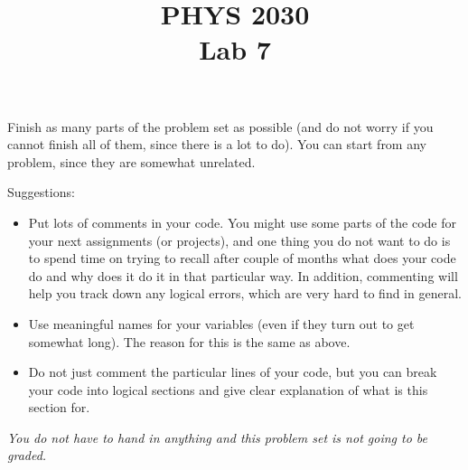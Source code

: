 \documentclass[letterpaper]{article}
\title{PHYS 2030 \\Lab 7}
\begin{document}
\maketitle
Finish as many parts of the problem set as possible (and do not worry if you cannot finish all of them, since there is a lot to do). You can start from any problem, since they are somewhat unrelated.

Suggestions: 
\begin{itemize}
\item Put lots of comments in your code. You might use some parts of the code for your next assignments (or projects), and one thing you do not want to do is to spend time on trying to recall after couple of months what does your code do and why does it do it in that particular way. In addition, commenting will help you track down any logical errors, which are very hard to find in general.
\item  Use meaningful names for your variables (even if they turn out to get somewhat long). The reason for this is the same as above.
\item Do not just comment the particular lines of your code, but you can break your code into logical sections and give clear explanation of what is this section for.
\end{itemize}

\emph{You do not have to hand in anything and this problem set is not going to be graded.} 
\end{document}
